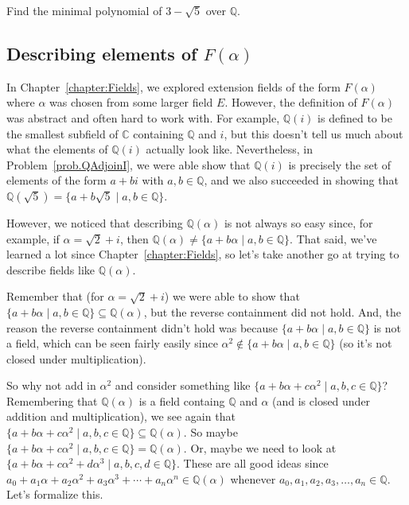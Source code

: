 \begin{problem}
Find the minimal polynomial of $3-\sqrt{5}$ over $\mathbb{Q}$.
\end{problem}

\subsection{Describing elements of $F(\alpha)$}

In Chapter~\ref{chapter:Fields}, we explored extension fields of the form $F(\alpha)$ where $\alpha$ was chosen from some larger field $E$. However, the definition of $F(\alpha)$ was abstract and often hard to work with. For example, $\mathbb{Q}(i)$ is defined to be the smallest subfield of $\mathbb{C}$ containing $\mathbb{Q}$ and $i$, but this doesn't tell us much about what the elements of $\mathbb{Q}(i)$ actually look like. Nevertheless, in Problem~\ref{prob.QAdjoinI}, we were able show that $\mathbb{Q}(i)$ is precisely the set of elements of the form $a+bi$ with $a,b\in \mathbb{Q}$, and we also succeeded in showing that $\mathbb{Q}(\sqrt{5}) = \{a+b\sqrt{5}\mid a,b\in \mathbb{Q}\}$. 

However, we noticed that describing $\mathbb{Q}(\alpha)$ is not always so easy since, for example, if $\alpha = \sqrt{2} + i$, then $\mathbb{Q}(\alpha) \neq \{a+b\alpha\mid a,b\in \mathbb{Q}\}$. That said, we've learned a lot since Chapter~\ref{chapter:Fields}, so let's take another go at trying to describe fields like $\mathbb{Q}(\alpha)$. 

Remember that (for $\alpha = \sqrt{2} + i$) we were able to show that $\{a+b\alpha\mid a,b\in \mathbb{Q}\} \subseteq \mathbb{Q}(\alpha)$, but the reverse containment did not hold. And, the reason the reverse containment didn't hold was because $\{a+b\alpha\mid a,b\in \mathbb{Q}\}$ is not a field, which can be seen fairly easily since $\alpha^2 \notin \{a+b\alpha\mid a,b\in \mathbb{Q}\}$ (so it's not closed under multiplication). 

So why not add in $\alpha^2$ and consider something like  $\{a+b\alpha + c\alpha^2\mid a,b,c\in \mathbb{Q}\}$? Remembering that $\mathbb{Q}(\alpha)$ is a field containg $\mathbb{Q}$ and $\alpha$ (and is closed under addition and multiplication), we see again that $\{a+b\alpha + c\alpha^2\mid a,b,c\in \mathbb{Q}\} \subseteq \mathbb{Q}(\alpha)$. So maybe $\{a+b\alpha + c\alpha^2\mid a,b,c\in \mathbb{Q}\} = \mathbb{Q}(\alpha)$. Or, maybe we need to look at $\{a+b\alpha + c\alpha^2 + d\alpha^3\mid a,b,c,d\in \mathbb{Q}\}$. These are all good ideas since $a_0+a_1\alpha + a_2\alpha^2 + a_3\alpha^3 + \cdots + a_n\alpha^n \in \mathbb{Q}(\alpha)$ whenever $a_0,a_1,a_2,a_3,\ldots,a_n\in \mathbb{Q}$. Let's formalize this.


